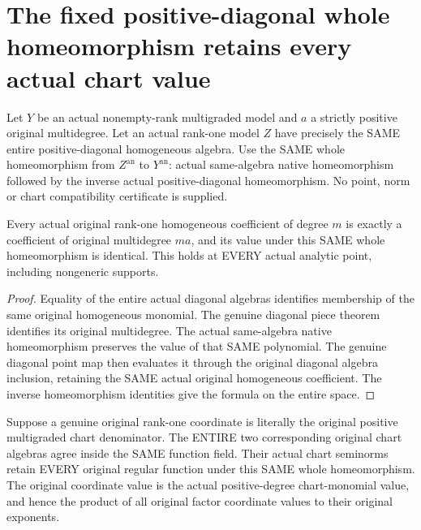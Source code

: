 \section{The fixed positive-diagonal whole homeomorphism retains every actual chart value}
\begin{definition}\label{def:positive-diagonal-same-algebra-homeomorphism}
\leanok
{}
Let $Y$ be an actual nonempty-rank multigraded model and $a$ a strictly positive original multidegree. Let an actual rank-one model $Z$ have precisely the SAME entire positive-diagonal homogeneous algebra. Use the SAME whole homeomorphism from $Z^{\mathrm{an}}$ to $Y^{\mathrm{an}}$: actual same-algebra native homeomorphism followed by the inverse actual positive-diagonal homeomorphism. No point, norm or chart compatibility certificate is supplied.
\end{definition}
\begin{theorem}\label{thm:positive-diagonal-same-algebra-piece-values}
\leanok
{}
Every actual original rank-one homogeneous coefficient of degree $m$ is exactly a coefficient of original multidegree $ma$, and its value under this SAME whole homeomorphism is identical. This holds at EVERY actual analytic point, including nongeneric supports.
\end{theorem}
\begin{proof}
Equality of the entire actual diagonal algebras identifies membership of the same original homogeneous monomial. The genuine diagonal piece theorem identifies its original multidegree. The actual same-algebra native homeomorphism preserves the value of that SAME polynomial. The genuine diagonal point map then evaluates it through the original diagonal algebra inclusion, retaining the SAME actual original homogeneous coefficient. The inverse homeomorphism identities give the formula on the entire space.
\end{proof}
\begin{theorem}\label{thm:positive-diagonal-same-algebra-chart-values}
\leanok
{}
Suppose a genuine original rank-one coordinate is literally the original positive multigraded chart denominator. The ENTIRE two corresponding original chart algebras agree inside the SAME function field. Their actual chart seminorms retain EVERY original regular function under this SAME whole homeomorphism. The original coordinate value is the actual positive-degree chart-monomial value, and hence the product of all original factor coordinate values to their original exponents.
\end{theorem}
